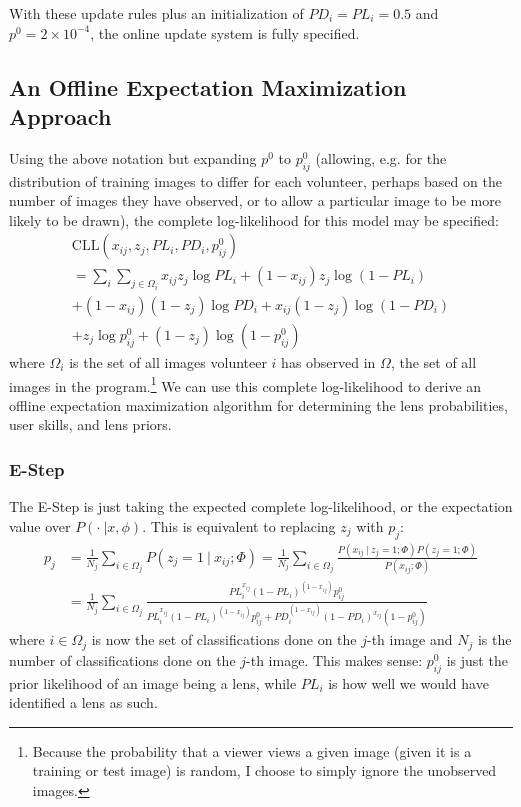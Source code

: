 \documentclass[useAMS,usenatbib,a4paper]{mn2e}
\begin{document}
With these update rules plus an initialization of $PD_{i} = PL_{i} = 0.5$ and
$p^{0} = 2 \times 10^{-4}$, the online update system is fully specified.


\subsection{An Offline Expectation Maximization Approach}
\label{sec:formalism:em}
Using the above notation but expanding $p^{0}$ to $p_{ij}^{0}$ (allowing, e.g. for
the distribution of training images to differ for each volunteer, perhaps based on
the number of images they have observed, or to allow a particular image to be
more likely to be drawn), the complete log-likelihood for this model may be
specified:
\begin{multline}
  \mathrm{CLL}(x_{ij}, z_{j}, PL_{i}, PD_{i}, p_{ij}^{0}) \\ = \sum_{i} \sum_{j \in \Omega_i} x_{ij} z_{j} \log PL_{i} +
      (1 - x_{ij}) z_j \log (1 -
      PL_{i}) \\ + (1 - x_{ij}) (1 - z_j) \log PD_{i} + x_{ij} (1 - z_j) \log (1 - PD_{i}) \\ + z_j \log p_{ij}^{0} +
      (1 - z_j ) \log(1 - p_{ij}^{0})
\end{multline}
where $\Omega_i$ is the set of all images volunteer $i$ has observed in $\Omega$,
the set of all images in the program.\footnote{Because the probability that a
  viewer views a given image (given it is a training or test image) is random,
I choose to simply ignore the unobserved images.} We can use this complete
log-likelihood to derive an offline expectation maximization algorithm for
determining the lens probabilities, user skills, and lens priors.


\subsubsection{E-Step}
\label{sec:formalism:em:estep}
The E-Step is just taking the expected complete log-likelihood, or the
expectation value over $P(\cdot \ | x, \phi)$. This is equivalent to replacing
$z_j$ with $p_j$:
\begin{align}
  p_j &= \frac{1}{N_j} \sum_{i \in \Omega_j} P(z_j = 1 \ | \ x_{ij} ; \Phi) =
  \frac{1}{N_j} \sum_{i \in \Omega_j} \frac{ P(x_{ij} \ | \ z_j = 1; \Phi)
P(z_j = 1 ; \Phi)}{P(x_{ij} ; \Phi)} \\
&= \frac{1}{N_j} \sum_{i \in \Omega_j} \frac{ PL_{i}^{x_{ij}} (1 - PL_{i})^{(1 -
x_{ij})} p_{ij}^{0}}{ PL_{i}^{x_{ij}} (1 -
  PL_{i})^{(1 - x_{ij})} p_{ij}^{0} + PD_{i}^{(1 - x_{ij})} (1 -
PD_{i})^{x_{ij}} (1 - p_{ij}^{0})}
\end{align}
where $i \in \Omega_j$ is now the set of classifications done on the $j$-th
image and $N_j$ is the number of classifications done on the $j$-th image. This
makes sense: $p_{ij}^{0}$ is just the prior likelihood of an image being a lens,
while $PL_{i}$ is how well we would have identified a lens as such.
\end{document}
